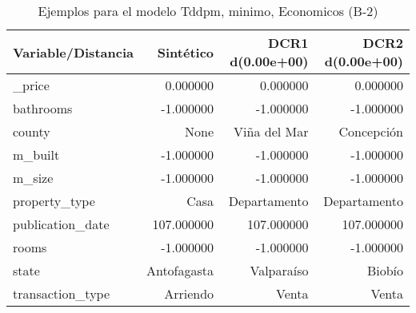 \begin{table}[H]
\centering
\fontsize{10}{14}\selectfont
\caption{Ejemplos para el modelo Tddpm, minimo, Economicos (B-2)}
\label{table-example-economicos-b-2-tddpm_mlp-min}
\begin{tabular}{|l|r|r|r|}
\hline
\rowcolor[gray]{0.8}
Variable/Distancia & Sintético & DCR1 d(0.00e+00) & DCR2 d(0.00e+00) \\
\hline \_price & \cellcolor[rgb]{0.9, 0.54, 0.52} 0.000000 & \cellcolor[rgb]{0.9, 0.54, 0.52} 0.000000 & \cellcolor[rgb]{0.9, 0.54, 0.52} 0.000000 \\
\hline bathrooms & \cellcolor[rgb]{0.9, 0.54, 0.52} -1.000000 & \cellcolor[rgb]{0.9, 0.54, 0.52} -1.000000 & \cellcolor[rgb]{0.9, 0.54, 0.52} -1.000000 \\
\hline county & \cellcolor[rgb]{0.9, 0.54, 0.52} None & Viña del Mar & Concepción \\
\hline m\_built & \cellcolor[rgb]{0.9, 0.54, 0.52} -1.000000 & \cellcolor[rgb]{0.9, 0.54, 0.52} -1.000000 & \cellcolor[rgb]{0.9, 0.54, 0.52} -1.000000 \\
\hline m\_size & \cellcolor[rgb]{0.9, 0.54, 0.52} -1.000000 & \cellcolor[rgb]{0.9, 0.54, 0.52} -1.000000 & \cellcolor[rgb]{0.9, 0.54, 0.52} -1.000000 \\
\hline property\_type & \cellcolor[rgb]{0.9, 0.54, 0.52} Casa & Departamento & Departamento \\
\hline publication\_date & \cellcolor[rgb]{0.9, 0.54, 0.52} 107.000000 & \cellcolor[rgb]{0.9, 0.54, 0.52} 107.000000 & \cellcolor[rgb]{0.9, 0.54, 0.52} 107.000000 \\
\hline rooms & \cellcolor[rgb]{0.9, 0.54, 0.52} -1.000000 & \cellcolor[rgb]{0.9, 0.54, 0.52} -1.000000 & \cellcolor[rgb]{0.9, 0.54, 0.52} -1.000000 \\
\hline state & \cellcolor[rgb]{0.9, 0.54, 0.52} Antofagasta & Valparaíso & Biobío \\
\hline transaction\_type & \cellcolor[rgb]{0.9, 0.54, 0.52} Arriendo & Venta & Venta \\
\hline
\end{tabular}
\end{table}
